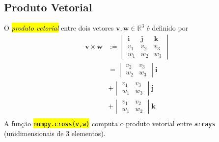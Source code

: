 \subsection{Produto Vetorial}

O \hl{\emph{produto vetorial}} entre dois vetores $\pmb{v}, \pmb{w}\in\mathbb{R}^3$ é definido por
\begin{subequations}
  \begin{align}
    \pmb{v}\times\pmb{w} &:=
                           \begin{vmatrix}
                             \pmb{i} & \pmb{j} & \pmb{k}\\
                             v_1 & v_2 & v_3\\
                             w_1 & w_2 & w_3
                           \end{vmatrix}\\
                         &=
                           \begin{vmatrix}
                             v_2 & v_3\\
                             w_2 & w_3
                           \end{vmatrix}\pmb{i}\\
                         &+ \begin{vmatrix}
                             v_1 & v_3\\
                             w_1 & w_3
                           \end{vmatrix}\pmb{j}\\
                         &+ \begin{vmatrix}
                             v_1 & v_2\\
                             w_1 & w_2
                           \end{vmatrix}\pmb{k}\\
  \end{align}
\end{subequations}
A função \hl{{\lstinline+numpy.cross(v,w)+}} computa o produto vetorial entre \lstinline+arrays+ (unidimensionais de 3 elementos).

